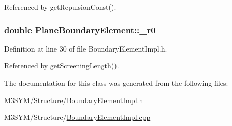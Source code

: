 Referenced by get\+Repulsion\+Const().

\hypertarget{classPlaneBoundaryElement_a3638279689c7293ccce4d09946aa2dca}{
\subsubsection[{\+\_\+r0}]{\setlength{\rightskip}{0pt plus 5cm}double Plane\+Boundary\+Element\+::\+\_\+r0\hspace{0.3cm}{\ttfamily [private]}}}\label{classPlaneBoundaryElement_a3638279689c7293ccce4d09946aa2dca}


Definition at line 30 of file Boundary\+Element\+Impl.\+h.



Referenced by get\+Screening\+Length().



The documentation for this class was generated from the following files\+:\begin{DoxyCompactItemize}
\item 
M3\+S\+Y\+M/\+Structure/\hyperlink{BoundaryElementImpl_8h}{Boundary\+Element\+Impl.\+h}\item 
M3\+S\+Y\+M/\+Structure/\hyperlink{BoundaryElementImpl_8cpp}{Boundary\+Element\+Impl.\+cpp}\end{DoxyCompactItemize}
